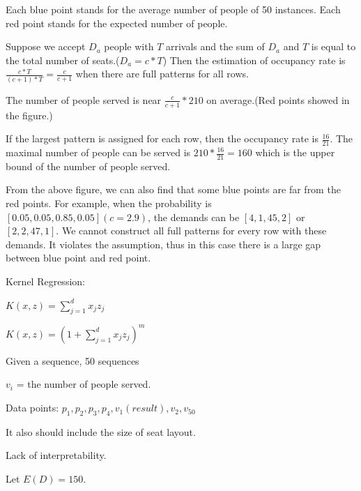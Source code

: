 Each blue point stands for the average number of people of 50 instances.
Each red point stands for the expected number of people.

Suppose we accept $D_a$ people with $T$ arrivals and the sum of $D_a$ and $T$ is equal to the total number of seats.($D_a = c * T$) Then the estimation of occupancy rate is $\frac{c * T}{(c+1) * T}= \frac{c}{c+1}$ when there are full patterns for all rows.


The number of people served is near $\frac{c}{c+1} * 210$ on average.(Red points showed in the figure.) 

If the largest pattern is assigned for each row, then the occupancy rate is $\frac{16}{21}$. The maximal number of people can be served is $210 * \frac{16}{21} =160$ which is the upper bound of the number of people served.

From the above figure, we can also find that some blue points are far from the red points. For example, when the probability is $[0.05, 0.05, 0.85, 0.05](c =2.9)$, the demands can be $[4, 1, 45, 2]$ or $[2, 2, 47, 1]$. We cannot construct all full patterns for every row with these demands. It violates the assumption, thus in this case there is a large gap between blue point and red point.






Kernel Regression:

$K(x,z) = \sum_{j=1}^d x_j z_j$

$K(x, z) = (1 + \sum_{j=1}^{d} x_j z_j)^m$

Given a sequence, 50 sequences

$v_i$ = the number of people served.
 
Data points: $p_1, p_2, p_3, p_4, v_1(result), v_2, v_{50}$

It also should include the size of seat layout.

Lack of interpretability.

\newpage

Let $E(D) = 150$.

